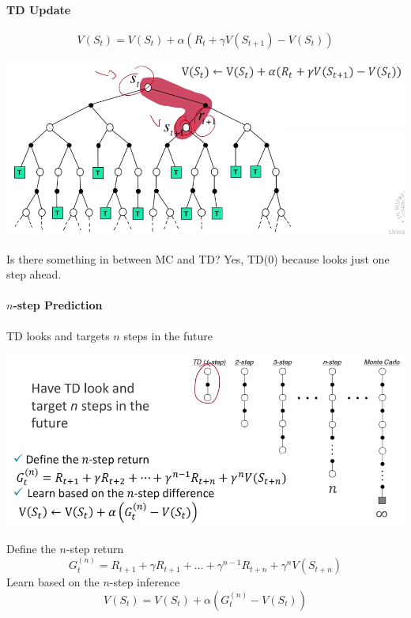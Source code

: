 \documentclass[10pt]{report}
\begin{document}
\paragraph{TD Update}
$$V(S_t) = V(S_t) +\alpha(R_t+\gamma V(S_{t+1})-V(S_t))$$
\begin{center}
	\includegraphics[scale=0.5]{168.png}
\end{center}
Is there something in between MC and TD? Yes, TD(0) because looks just one step ahead.
\paragraph{$n$-step Prediction} TD looks and targets $n$ steps in the future
\begin{center}
	\includegraphics[scale=0.5]{169.png}
\end{center}
Define the $n$-step return
$$G_t^{(n)} = R_{t+1}+\gamma R_{t+1}+\ldots+ \gamma^{n-1}R_{t+n} + \gamma^n V(S_{t+n})$$
Learn based on the $n$-step inference
$$V(S_t) = V(S_t) + \alpha\left(G_t^{(n)} - V(S_t)\right)$$
\end{document}
